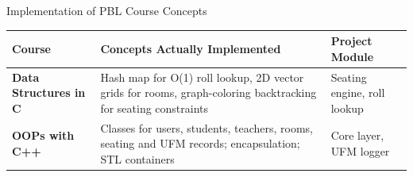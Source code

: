 \documentclass[aspectratio=169,11pt]{beamer}
\begin{document}
\begin{frame}{Implementation of PBL Course Concepts}

\scriptsize

\begin{center}

\renewcommand{\arraystretch}{1.4}

\begin{tabularx}{.96\textwidth}
{@{}>{\bfseries}p{2.8cm}X p{3.2cm}@{}}

\toprule
Course & Concepts Actually Implemented & Project Module\\
\midrule

Data Structures in C &
Hash map for O(1) roll lookup, 2D vector grids for rooms,
graph-coloring backtracking for seating constraints &
Seating engine, roll lookup\\

OOPs with C++ &
Classes for users, students, teachers, rooms, seating and UFM records;
encapsulation; STL containers &
Core layer, UFM logger\\

\bottomrule

\end{tabularx}

\end{center}

\end{frame}
\end{document}
